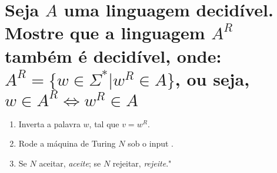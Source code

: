 \section{
    Seja \(A\) uma linguagem decidível. Mostre que a linguagem \(A^R\) também é decidível, onde: \\
    \(A^R = \{w \in \Sigma^* | w^R \in A\}\), ou seja,   
    \(w \in A^R \Leftrightarrow w^R \in A\)
    }

\setlength{\parindent}{4em}
\setlength{\parskip}{0.5em}
\renewcommand{\baselinestretch}{1}

\blintext

\begin{enumerate}    
    \item Inverta a palavra \(w\), tal que \(v = w^R\).

    \item Rode a máquina de Turing \(N\) sob o input \(<A,v>\).

    \item Se \(N\) aceitar, \textit{aceite}; se \(N\) rejeitar, \textit{rejeite}."
\end{enumerate}